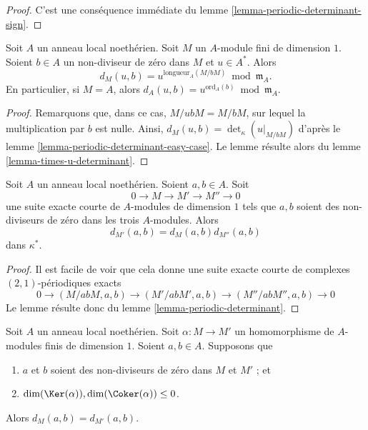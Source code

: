 \begin{proof}
C'est une conséquence immédiate du lemme \ref{lemma-periodic-determinant-sign}.
\end{proof}

\begin{lemma}
\label{lemma-symbol-when-one-is-a-unit}
Soit $A$ un anneau local noethérien.
Soit $M$ un $A$-module fini de dimension $1$.
Soient $b \in A$ un non-diviseur de zéro dans $M$ et $u \in A^*$.
Alors
$$
d_M(u, b) = u^{\text{longueur}_A(M/bM)} \bmod \mathfrak m_A.
$$
En particulier, si $M = A$, alors
$d_A(u, b) = u^{\text{ord}_A(b)} \bmod \mathfrak m_A$.
\end{lemma}

\begin{proof}
Remarquons que, dans ce cas, $M/ubM = M/bM$, sur lequel la multiplication
par $b$ est nulle. Ainsi, $d_M(u, b) = \det_\kappa(u|_{M/bM})$
d'après le lemme \ref{lemma-periodic-determinant-easy-case}. Le lemme
résulte alors du lemme \ref{lemma-times-u-determinant}.
\end{proof}

\begin{lemma}
\label{lemma-symbol-short-exact-sequence}
Soit $A$ un anneau local noethérien.
Soient $a, b \in A$.
Soit
$$
0 \to M \to M' \to M'' \to 0
$$
une suite exacte courte de $A$-modules de dimension $1$
tels que $a, b$ soient des non-diviseurs de zéro dans
les trois $A$-modules.
Alors
$$
d_{M'}(a, b) = d_M(a, b) d_{M''}(a, b)
$$
dans $\kappa^*$.
\end{lemma}

\begin{proof}
Il est facile de voir que cela donne une suite exacte courte
de complexes $(2, 1)$-périodiques exacts
$$
0 \to
(M/abM, a, b) \to
(M'/abM', a, b) \to
(M''/abM'', a, b) \to 0
$$
Le lemme résulte donc du lemme \ref{lemma-periodic-determinant}.
\end{proof}

\begin{lemma}
\label{lemma-symbol-compare-modules}
Soit $A$ un anneau local noethérien.
Soit $\alpha : M \to M'$ un homomorphisme de
$A$-modules finis de dimension $1$.
Soient $a, b \in A$. Supposons que
\begin{enumerate}
\item $a$ et $b$ soient des non-diviseurs de zéro dans $M$ et $M'$ ; et
\item $\dim(\Ker(\alpha)), \dim(\Coker(\alpha)) \leq 0$.
\end{enumerate}
Alors $d_M(a, b) = d_{M'}(a, b)$.
\end{lemma}

